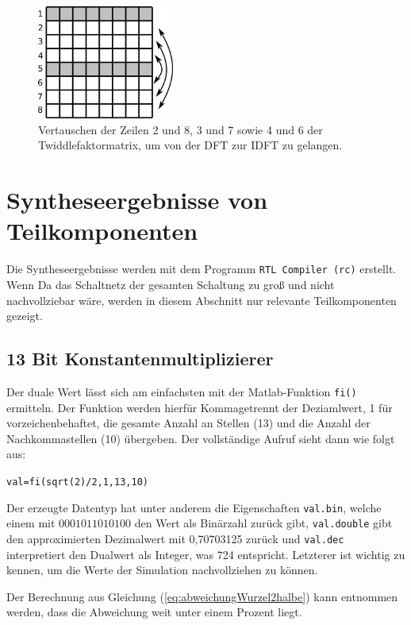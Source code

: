 \begin{figure}[ht]
 \centering
 \includegraphics[width=0.4\textwidth]{img/IDFT_Zeilentausch.png}
 \caption{Vertauschen der Zeilen 2 und 8, 3 und 7 sowie 4 und 6 der Twiddlefaktormatrix, um von der DFT zur IDFT zu gelangen.}
 \label{pic:IDFT_Zeilentausch}
\end{figure}




\section{Syntheseergebnisse von Teilkomponenten}\label{sec:Syntheseergebnisse}
Die Syntheseergebnisse werden mit dem Programm  \texttt{RTL Compiler (rc)} erstellt. Wenn 
Da das Schaltnetz der gesamten Schaltung zu groß und nicht nachvollziebar wäre, werden in diesem Abschnitt nur relevante Teilkomponenten gezeigt.

\subsection{13 Bit Konstantenmultiplizierer}\label{sec:Konstantenmultiplizierer}

Der duale Wert lässt sich am einfachsten mit der Matlab-Funktion \texttt{fi()} ermitteln. Der Funktion werden hierfür Kommagetrennt der Deziamlwert, 1 für vorzeichenbehaftet,
die gesamte Anzahl an Stellen (13) und die Anzahl der Nachkommastellen (10) übergeben. Der vollständige Aufruf sieht dann wie folgt aus:

\texttt{val=fi(sqrt(2)/2,1,13,10)}

Der erzeugte Datentyp hat unter anderem die Eigenschaften \texttt{val.bin}, welche einem mit $0001011010100$ den Wert als Binärzahl zurück gibt, 
\texttt{val.double} gibt den approximierten Dezimalwert mit 0,70703125 zurück und \texttt{val.dec} interpretiert den Dualwert als Integer, was 724 entspricht.
Letzterer ist wichtig zu kennen, um die Werte der Simulation nachvollziehen zu können.

Der Berechnung aus Gleichung (\ref{eq:abweichungWurzel2halbe}) kann entnommen werden, dass die Abweichung weit unter einem Prozent liegt.

